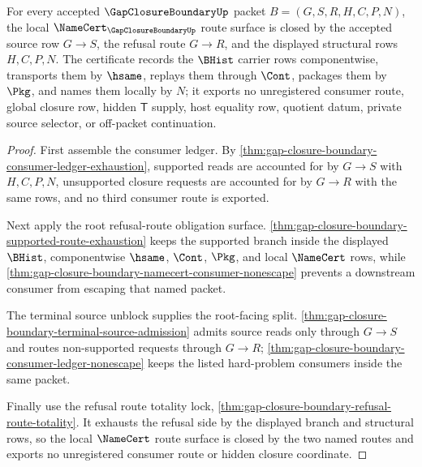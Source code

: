 \begin{theorem}
\label{thm:gap-closure-boundary-namecert-route-closure}
For every accepted $\GapClosureBoundaryUp$ packet $B=(G,S,R,H,C,P,N)$, the local $\NameCert_{\GapClosureBoundaryUp}$ route surface is closed by the accepted source row $G \longrightarrow S$, the refusal route $G \longrightarrow R$, and the displayed structural rows $H,C,P,N$. The certificate records the $\BHist$ carrier rows componentwise, transports them by $\hsame$, replays them through $\Cont$, packages them by $\Pkg$, and names them locally by $N$; it exports no unregistered consumer route, global closure row, hidden $\mathsf{T}$ supply, host equality row, quotient datum, private source selector, or off-packet continuation.
\end{theorem}
\begin{proof}
First assemble the consumer ledger. By \autoref{thm:gap-closure-boundary-consumer-ledger-exhaustion}, supported reads are accounted for by $G \longrightarrow S$ with $H,C,P,N$, unsupported closure requests are accounted for by $G \longrightarrow R$ with the same rows, and no third consumer route is exported.

Next apply the root refusal-route obligation surface. \autoref{thm:gap-closure-boundary-supported-route-exhaustion} keeps the supported branch inside the displayed $\BHist$, componentwise $\hsame$, $\Cont$, $\Pkg$, and local $\NameCert$ rows, while \autoref{thm:gap-closure-boundary-namecert-consumer-nonescape} prevents a downstream consumer from escaping that named packet.

The terminal source unblock supplies the root-facing split. \autoref{thm:gap-closure-boundary-terminal-source-admission} admits source reads only through $G \longrightarrow S$ and routes non-supported requests through $G \longrightarrow R$; \autoref{thm:gap-closure-boundary-consumer-ledger-nonescape} keeps the listed hard-problem consumers inside the same packet.

Finally use the refusal route totality lock, \autoref{thm:gap-closure-boundary-refusal-route-totality}. It exhausts the refusal side by the displayed branch and structural rows, so the local $\NameCert$ route surface is closed by the two named routes and exports no unregistered consumer route or hidden closure coordinate.
\end{proof}
